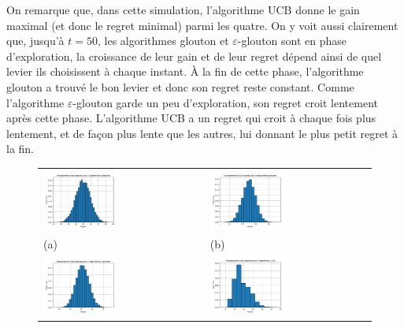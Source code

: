 \documentclass[a4paper,12pt]{article}
\begin{document}
On remarque que, dans cette simulation, l'algorithme UCB donne le gain maximal (et donc le regret minimal) parmi les quatre. On y voit aussi clairement que, jusqu'à $t = 50$, les algorithmes glouton et $\varepsilon$-glouton sont en phase d'exploration, la croissance de leur gain et de leur regret dépend ainsi de quel levier ils choisissent à chaque instant. À la fin de cette phase, l'algorithme glouton a trouvé le bon levier et donc son regret reste constant. Comme l'algorithme $\varepsilon$-glouton garde un peu d'exploration, son regret croit lentement après cette phase. L'algorithme UCB a un regret qui croit à chaque fois plus lentement, et de façon plus lente que les autres, lui donnant le plus petit regret à la fin.

\begin{figure}[ht]
\centering
\begin{tabular}{@{} >{\centering} m{} @{} >{\centering} m{} @{}}
\includegraphics[width=0.5\textwidth]{Hist_alea} & \includegraphics[width=0.5\textwidth]{Hist_glouton} \tabularnewline
(a) & (b) \tabularnewline
\includegraphics[width=0.5\textwidth]{Hist_glouton_e} & \includegraphics[width=0.5\textwidth]{Hist_UCB} \tabularnewline

\end{tabular}
\end{figure}
\end{document}
